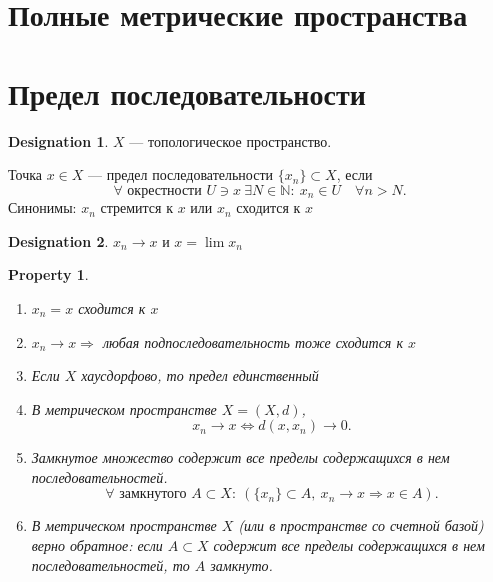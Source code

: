 \documentclass[11pt]{book}
\newcommand{\N}{\mathbb{N}}
\theoremstyle{definition}
\theoremstyle{plain}
\theoremstyle{plain}
\newtheorem*{prop}{Property}
\theoremstyle{definition}
\newtheorem*{name}{Designation}
\theoremstyle{remark}
\begin{document}
\section{Полные метрические пространства}
\section{Предел последовательности}
\begin{name}
    $ X$ ---  топологическое пространство.
\end{name}
\begin{defn}
    Точка $ x \in  X$ --- предел последовательности $ \{x_n\} \subset X$, если$$ \forall \text{ окрестности } U \ni x ~ \exists N \in \N: ~ x_n \in  U \quad \forall n > N.$$
    Синонимы:
    $ x_n$ стремится к  $ x$ или  $ x_{n}$ сходится к $ x$
    \begin{name}
	$ x_{n} \to  x$ и $ x = \lim x_{n} $
    \end{name}
\end{defn}
\begin{prop}
    $ $
    \begin{enumerate}
	\item $ x_{n} = x$ сходится к $ x$
	\item $ x_{n} \to  x \Longrightarrow $ любая подпоследовательность тоже сходится к $ x$
	\item Если  $ X$ хаусдорфово, то предел единственный
	\item  В метрическом пространстве $ X = (X, d)$,
	    \[
		x_{n} \to  x \Longleftrightarrow d(x, x_n) \to  0
	    .\]
	\item Замкнутое множество содержит все пределы содержащихся в нем последовательностей.
	    \[
		\forall  \text{ замкнутого } A \subset X: ~ (\{x_{n}\} \subset A, ~ x_{n} \to  x \Longrightarrow x \in  A)
	    .\]
	\item В метрическом пространстве $ X$ (или в пространстве со счетной базой) верно обратное:
	    если $ A \subset X$ содержит все пределы содержащихся в нем последовательностей, то $ A$ замкнуто.
    \end{enumerate}
\end{prop}
\end{document}
